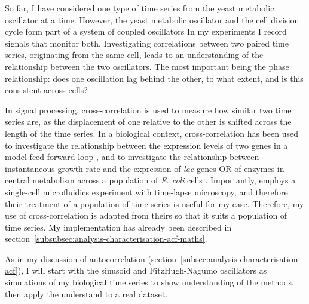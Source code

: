 So far, I have considered one type of time series from the yeast metabolic oscillator at a time.
However, the yeast metabolic oscillator and the cell division cycle form part of a system of coupled oscillators
In my experiments I record signals that monitor both.
Investigating correlations between two paired time series, originating from the same cell, leads to an understanding of the relationship between the two oscillators.
The most important being the phase relationship: does one oscillation lag behind the other, to what extent, and is this consistent across cells?


In signal processing, cross-correlation is used to measure how similar two time series are, as the displacement of one relative to the other is shifted across the length of the time series.
In a biological context, cross-correlation has been used to investigate the relationship between the expression levels of two genes in a model feed-forward loop \parencite{dunlopRegulatoryActivityRevealed2008},
and to investigate the relationship between instantaneous growth rate and the expression of \textit{lac} genes OR of enzymes in central metabolism across a population of \textit{E. coli} cells \parencite{kivietStochasticityMetabolismGrowth2014}.
Importantly, \textcite{kivietStochasticityMetabolismGrowth2014} employs a single-cell microfluidics experiment with time-lapse microscopy, and therefore their treatment of a population of time series is useful for my case.
Therefore, my use of cross-correlation is adapted from theirs so that it suits a population of time series.
My implementation has already been described in section~\ref{subsubsec:analysis-characterisation-acf-maths}.

As in my discussion of autocorrelation (section~\ref{subsec:analysis-characterisation-acf}), I will start with the sinusoid and FitzHugh-Nagumo oscillators as simulations of my biological time series to show understanding of the methods, then apply the understand to a real dataset.

